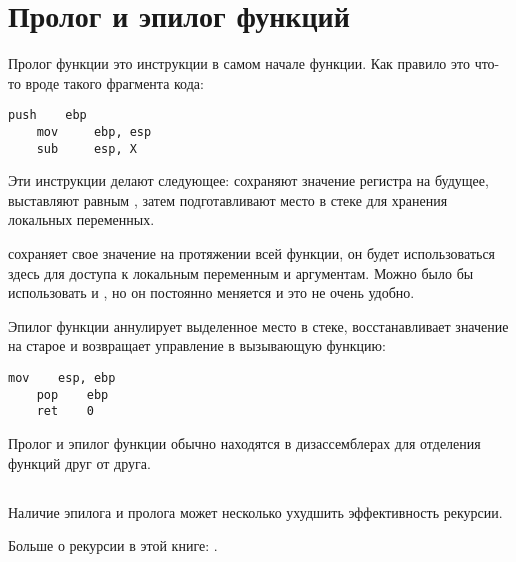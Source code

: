 \section{Пролог и эпилог функций}
\label{sec:prologepilog}

Пролог функции это инструкции в самом начале функции. Как правило это что-то вроде такого фрагмента кода:

\begin{lstlisting}[style=customasmx86]
    push    ebp
    mov     ebp, esp
    sub     esp, X
\end{lstlisting}

Эти инструкции делают следующее: сохраняют значение регистра \EBP на будущее, выставляют \EBP равным \ESP,
затем подготавливают место в стеке для хранения локальных переменных.

\EBP сохраняет свое значение на протяжении всей функции, он будет использоваться здесь для доступа 
к локальным переменным и аргументам. Можно было бы использовать и \ESP, но он постоянно меняется и 
это не очень удобно.

Эпилог функции аннулирует выделенное место в стеке, восстанавливает значение \EBP на старое и возвращает 
управление в вызывающую функцию:

\begin{lstlisting}[style=customasmx86]
    mov    esp, ebp
    pop    ebp
    ret    0
\end{lstlisting}

Пролог и эпилог функции обычно находятся в дизассемблерах для отделения функций друг от друга.

\subsection{\Recursion}

\myindex{\Recursion}
Наличие эпилога и пролога может несколько ухудшить эффективность рекурсии.

Больше о рекурсии в этой книге: .
